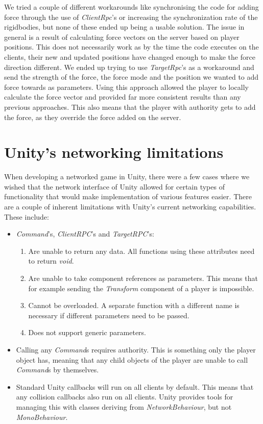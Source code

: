 We tried a couple of different workarounds like synchronising the code for adding force through the use of \emph{ClientRpc}'s or increasing the synchronization rate of the rigidbodies, but none of these ended up being a usable solution. The issue in general is a result of calculating force vectors on the server based on player positions. This does not necessarily work as by the time the code executes on the clients, their new and updated positions have changed enough to make the force direction different. We ended up trying to use \emph{TargetRpc}'s as a workaround and send the strength of the force, the force mode and the position we wanted to add force towards as parameters. Using this approach allowed the player to locally calculate the force vector and provided far more consistent results than any previous approaches. This also means that the player with authority gets to add the force, as they override the force added on the server. 

\section{Unity's networking limitations}
\label{sec:networkLimitations}
When developing a networked game in Unity, there were a few cases where we wished that the network interface of Unity allowed for certain types of functionality that would make implementation of various features easier. There are a couple of inherent limitations with Unity's current networking capabilities. These include:
\begin{itemize}
    \item \emph{Command}'s, \emph{ClientRPC}'s and \emph{TargetRPC}'s:
    \begin{enumerate}
        \item Are unable to return any data. All functions using these attributes need to return \emph{void}.
        \item Are unable to take component references as parameters. This means that for example sending the \emph{Transform} component of a player is impossible. 
        \item Cannot be overloaded. A separate function with a different name is necessary if different parameters need to be passed. 
        \item Does not support generic parameters. 
    \end{enumerate}
    
    \item Calling any \emph{Command}s requires authority. This is something only the player object has, meaning that any child objects of the player are unable to call \emph{Command}s by themselves. 
    
    \item Standard Unity callbacks will run on all clients by default. This means that any collision callbacks also run on all clients. Unity provides tools for managing this with classes deriving from \emph{NetworkBehaviour}, but not \emph{MonoBehaviour}. 
\end{itemize}

